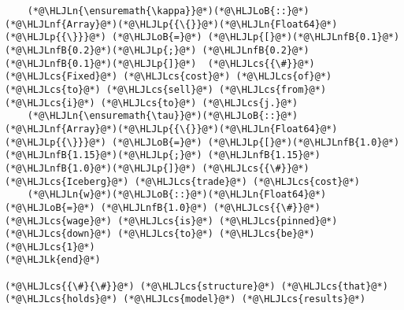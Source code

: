 \documentclass[12pt,a4paper]{article}
\newcommand{\HLJLk}[1]{\textcolor[RGB]{148,91,176}{\textbf{#1}}}
\newcommand{\HLJLn}[1]{#1}
\newcommand{\HLJLnf}[1]{\textcolor[RGB]{66,102,213}{#1}}
\newcommand{\HLJLnfB}[1]{\textcolor[RGB]{59,151,46}{#1}}
\newcommand{\HLJLoB}[1]{\textcolor[RGB]{102,102,102}{\textbf{#1}}}
\newcommand{\HLJLp}[1]{#1}
\newcommand{\HLJLcs}[1]{\textcolor[RGB]{153,153,119}{\textit{#1}}}
\begin{document}
\begin{lstlisting}
    (*@\HLJLn{\ensuremath{\kappa}}@*)(*@\HLJLoB{::}@*)(*@\HLJLnf{Array}@*)(*@\HLJLp{{\{}}@*)(*@\HLJLn{Float64}@*)(*@\HLJLp{{\}}}@*) (*@\HLJLoB{=}@*) (*@\HLJLp{[}@*)(*@\HLJLnfB{0.1}@*) (*@\HLJLnfB{0.2}@*)(*@\HLJLp{;}@*) (*@\HLJLnfB{0.2}@*) (*@\HLJLnfB{0.1}@*)(*@\HLJLp{]}@*)  (*@\HLJLcs{{\#}}@*) (*@\HLJLcs{Fixed}@*) (*@\HLJLcs{cost}@*) (*@\HLJLcs{of}@*) (*@\HLJLcs{to}@*) (*@\HLJLcs{sell}@*) (*@\HLJLcs{from}@*) (*@\HLJLcs{i}@*) (*@\HLJLcs{to}@*) (*@\HLJLcs{j.}@*)
    (*@\HLJLn{\ensuremath{\tau}}@*)(*@\HLJLoB{::}@*)(*@\HLJLnf{Array}@*)(*@\HLJLp{{\{}}@*)(*@\HLJLn{Float64}@*)(*@\HLJLp{{\}}}@*) (*@\HLJLoB{=}@*) (*@\HLJLp{[}@*)(*@\HLJLnfB{1.0}@*) (*@\HLJLnfB{1.15}@*)(*@\HLJLp{;}@*) (*@\HLJLnfB{1.15}@*) (*@\HLJLnfB{1.0}@*)(*@\HLJLp{]}@*) (*@\HLJLcs{{\#}}@*) (*@\HLJLcs{Iceberg}@*) (*@\HLJLcs{trade}@*) (*@\HLJLcs{cost}@*)
    (*@\HLJLn{w}@*)(*@\HLJLoB{::}@*)(*@\HLJLn{Float64}@*) (*@\HLJLoB{=}@*) (*@\HLJLnfB{1.0}@*) (*@\HLJLcs{{\#}}@*) (*@\HLJLcs{wage}@*) (*@\HLJLcs{is}@*) (*@\HLJLcs{pinned}@*) (*@\HLJLcs{down}@*) (*@\HLJLcs{to}@*) (*@\HLJLcs{be}@*) (*@\HLJLcs{1}@*)
(*@\HLJLk{end}@*)

(*@\HLJLcs{{\#}{\#}}@*) (*@\HLJLcs{structure}@*) (*@\HLJLcs{that}@*) (*@\HLJLcs{holds}@*) (*@\HLJLcs{model}@*) (*@\HLJLcs{results}@*)


\end{lstlisting}
\end{document}
